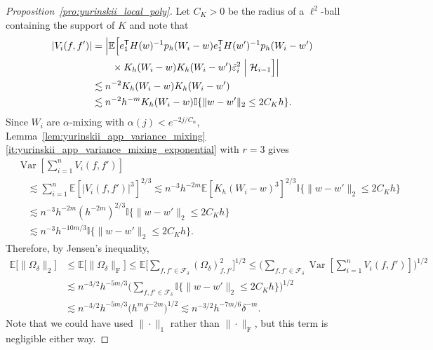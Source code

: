 \documentclass[11pt,lof]{puthesis}
\newcommand{\E}{\ensuremath{\mathbb{E}}}
\newcommand{\I}{\ensuremath{\mathbb{I}}}
\newcommand{\rF}{\ensuremath{\mathrm{F}}}
\newcommand{\cH}{\ensuremath{\mathcal{H}}}
\newcommand{\cF}{\ensuremath{\mathcal{F}}}
\newcommand{\T}{\ensuremath{\mathsf{T}}}
\DeclareMathOperator{\Var}{Var}
\theoremstyle{break}
\theoremstyle{proof}
\newtheorem{proof}{Proof}
\begin{document}
\begin{proof}[Proposition~\ref{pro:yurinskii_local_poly}]
  Let $C_K>0$ be the radius of a $\ell^2$-ball
  containing the support of $K$
  and note that
  \begin{align*}
    \left|
    V_i(f,f')
    \right|
    &=
    \Big|
    \E\Big[
      e_1^\T H(w)^{-1}
      p_h(W_i-w)
      e_1^\T H(w')^{-1}
      p_h(W_i-w') \\
      &\qquad\times
      K_h(W_i-w)
      K_h(W_i-w')
      \tilde\varepsilon_i^2
      \Bigm| \cH_{i-1}
    \Big]
    \Big| \\
    &\lesssim
    n^{-2}
    K_h(W_i-w)
    K_h(W_i-w') \\
    &\lesssim
    n^{-2}
    h^{-m}
    K_h(W_i-w)
    \I\{\|w-w'\|_2 \leq 2 C_K h\}.
  \end{align*}
  Since $W_i$ are $\alpha$-mixing
  with $\alpha(j) < e^{-2j / C_\alpha}$,
  Lemma~\ref{lem:yurinskii_app_variance_mixing}%
  \ref{it:yurinskii_app_variance_mixing_exponential}
  with $r=3$ gives
  \begin{align*}
    &\Var\left[
      \sum_{i=1}^n V_i(f,f')
    \right] \\
    &\quad\lesssim
    \sum_{i=1}^n
    \E\left[
      |V_i(f,f')|^3
    \right] ^{2/3}
    \lesssim
    n^{-3} h^{-2m}
    \E\left[
      K_h(W_i-w)^3
    \right] ^{2/3}
    \I\{\|w-w'\|_2 \leq 2 C_K h\} \\
    &\quad\lesssim
    n^{-3} h^{-2m}
    (h^{-2m})^{2/3}
    \I\{\|w-w'\|_2 \leq 2 C_K h\} \\
    &\quad\lesssim
    n^{-3} h^{-10m/3}
    \I\{\|w-w'\|_2 \leq 2 C_K h\}.
  \end{align*}
  Therefore, by Jensen's inequality,
  \begin{align*}
    \E\big[ \|\Omega_\delta\|_2 \big]
    &\leq
    \E\big[ \|\Omega_\delta\|_\rF \big]
    \leq
    \E\Bigg[
      \sum_{f,f' \in \cF_\delta}
      (\Omega_\delta)_{f,f'}^2
    \Bigg]^{1/2}
    \leq
    \Bigg(
      \sum_{f,f' \in \cF_\delta}
      \Var\left[
        \sum_{i=1}^n V_i(f,f')
      \right]
    \Bigg)^{1/2} \\
    &\lesssim
    n^{-3/2} h^{-5m/3}
    \Bigg(
      \sum_{f,f' \in \cF_\delta}
      \I\{\|w-w'\|_2 \leq 2 C_K h\}
    \Bigg)^{1/2} \\
    &\lesssim
    n^{-3/2} h^{-5m/3}
    \big(h^{m} \delta^{-2m} \big)^{1/2}
    \lesssim
    n^{-3/2}
    h^{-7m/6}
    \delta^{-m}.
  \end{align*}
  Note that we could have used
  $\|\cdot\|_1$ rather than $\|\cdot\|_\rF$,
  but this term is negligible either way.


\end{proof}
\end{document}
